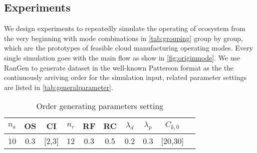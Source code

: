 
%     
%     
%     
%     
%     


\subsection{Experiments} %
\label{ssub:case_design}
We design experiments to repeatedly simulate the operating of ecosystem from the very beginning with mode combinations in \autoref{tab:grouping} group by group, which are the prototypes of feasible cloud manufacturing operating modes. Every single simulation goes with the main flow as show in \autoref{fig:originmode}. We use  RanGen \cite{Demeulemeester2003} to generate dataset in the well-known Patterson format as the the continuously arriving order for the simulation input, related parameter settings are listed in \autoref{tab:generalparameter}.
\begin{table}[htbp]
  \centering
  \scriptsize
  \caption{Order generating parameters setting}
    \begin{tabular}{cccccccccc}
    \toprule
    \textbf{$n_a$} & \textbf{OS} & \textbf{CI} & \textbf{$n_r$} & \textbf{RF} & \textbf{RC} & \textbf{$\lambda_d$} &\textbf{$\lambda_p$} & \textbf{$C_{k,0}$}\\
    \midrule
     10  &   0.3    &  [2,3]     &   12     &  0.3     &   0.5  & 0.2 & 0.3  & [20,30] \\
    \bottomrule
    \end{tabular}%
    {
    }
  \label{tab:generalparameter}%
\end{table}%

